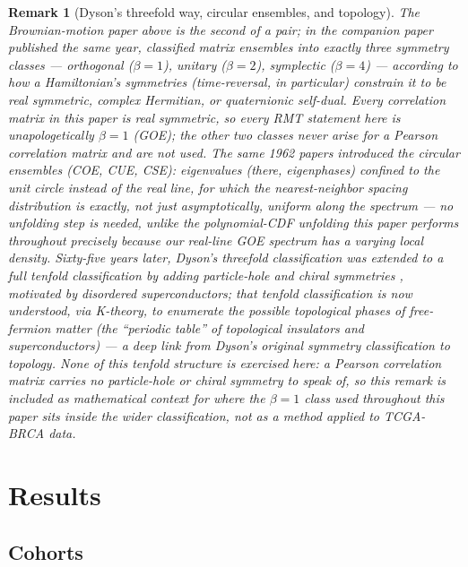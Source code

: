 \documentclass[11pt]{article}
\newtheorem{remark}{Remark}
\begin{document}
\begin{remark}[Dyson's threefold way, circular ensembles, and topology]
The Brownian-motion paper above is the second of a pair; in the
companion paper published the same year, \citet{dyson1962threefold}
classified matrix ensembles into exactly three symmetry classes ---
orthogonal ($\beta=1$), unitary ($\beta=2$), symplectic ($\beta=4$)
--- according to how a Hamiltonian's symmetries (time-reversal, in
particular) constrain it to be real symmetric, complex Hermitian, or
quaternionic self-dual. Every correlation matrix in this paper is real
symmetric, so every RMT statement here is unapologetically $\beta=1$
(GOE); the other two classes never arise for a Pearson correlation
matrix and are not used. The same 1962 papers introduced the
\emph{circular} ensembles (COE, CUE, CSE): eigenvalues (there,
eigenphases) confined to the unit circle instead of the real line,
for which the nearest-neighbor spacing distribution is
\emph{exactly}, not just asymptotically, uniform along the spectrum
--- no unfolding step is needed, unlike the polynomial-CDF unfolding
this paper performs throughout precisely because our real-line GOE
spectrum has a varying local density. Sixty-five years
later, Dyson's threefold classification was extended to a full
tenfold classification by adding particle-hole and chiral symmetries
\citep{altlandzirnbauer1997}, motivated by disordered
superconductors; that tenfold classification is now understood, via
K-theory, to enumerate the possible topological phases of
free-fermion matter (the ``periodic table'' of topological insulators
and superconductors) --- a deep link from Dyson's original
symmetry classification to topology. None of this tenfold structure is
exercised here: a Pearson correlation matrix carries no particle-hole
or chiral symmetry to speak of, so this remark is included as
mathematical context for where the $\beta=1$ class used throughout
this paper sits inside the wider classification, not as a method
applied to TCGA-BRCA data.
\end{remark}

\section{Results}

\subsection{Cohorts}
\end{document}
